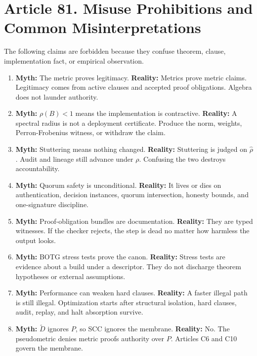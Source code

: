 \documentclass[10pt,oneside]{article}
\theoremstyle{definition}
\theoremstyle{remark}
\begin{document}
\section{Article 81. Misuse Prohibitions and Common Misinterpretations}
The following claims are forbidden because they confuse theorem, clause, implementation fact, or empirical observation.

\begin{hallofshame}
\begin{enumerate}[label=\textbf{H\arabic*.},leftmargin=2.6em,itemsep=4pt]
  \item \textbf{Myth:} The metric proves legitimacy. \textbf{Reality:} Metrics prove metric claims. Legitimacy comes from active clauses and accepted proof obligations. Algebra does not launder authority.
  \item \textbf{Myth:} \(\rho(B)<1\) means the implementation is contractive. \textbf{Reality:} A spectral radius is not a deployment certificate. Produce the norm, weights, Perron-Frobenius witness, or withdraw the claim.
  \item \textbf{Myth:} Stuttering means nothing changed. \textbf{Reality:} Stuttering is judged on \(\widehat\rho\). Audit and lineage still advance under \(\rho\). Confusing the two destroys accountability.
  \item \textbf{Myth:} Quorum safety is unconditional. \textbf{Reality:} It lives or dies on authentication, decision instances, quorum intersection, honesty bounds, and one-signature discipline.
  \item \textbf{Myth:} Proof-obligation bundles are documentation. \textbf{Reality:} They are typed witnesses. If the checker rejects, the step is dead no matter how harmless the output looks.
  \item \textbf{Myth:} BOTG stress tests prove the canon. \textbf{Reality:} Stress tests are evidence about a build under a descriptor. They do not discharge theorem hypotheses or external assumptions.
  \item \textbf{Myth:} Performance can weaken hard clauses. \textbf{Reality:} A faster illegal path is still illegal. Optimization starts after structural isolation, hard clauses, audit, replay, and halt absorption survive.
  \item \textbf{Myth:} \(\widetilde D\) ignores \(P\), so SCC ignores the membrane. \textbf{Reality:} No. The pseudometric denies metric proofs authority over \(P\). Articles C6 and C10 govern the membrane.
\end{enumerate}
\end{hallofshame}
\end{document}
